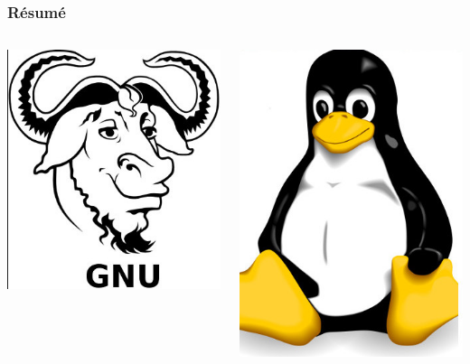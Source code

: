 \documentclass{beamer}
\begin{document}
\begin{frame}
\frametitle{Résumé}
\begin{columns}[c] 
\begin{center}
\includegraphics[scale=0.8] {./images/gnu.jpg} 
\end{center}
\begin{center}
\includegraphics[scale=0.8] {./images/linux.jpg} 
\end{center}
\end{columns}

\end{frame}
\end{document}

